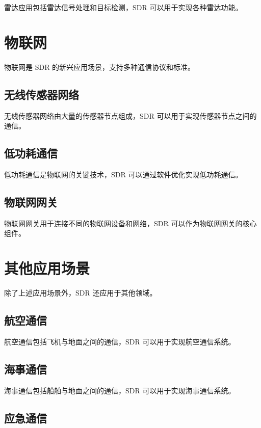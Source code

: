 \documentclass[UTF8]{ctexbook}
\begin{document}
雷达应用包括雷达信号处理和目标检测，SDR 可以用于实现各种雷达功能。

\section{物联网}

物联网是 SDR 的新兴应用场景，支持多种通信协议和标准。

\subsection{无线传感器网络}

无线传感器网络由大量的传感器节点组成，SDR 可以用于实现传感器节点之间的通信。

\subsection{低功耗通信}

低功耗通信是物联网的关键技术，SDR 可以通过软件优化实现低功耗通信。

\subsection{物联网网关}

物联网网关用于连接不同的物联网设备和网络，SDR 可以作为物联网网关的核心组件。

\section{其他应用场景}

除了上述应用场景外，SDR 还应用于其他领域。

\subsection{航空通信}

航空通信包括飞机与地面之间的通信，SDR 可以用于实现航空通信系统。

\subsection{海事通信}

海事通信包括船舶与地面之间的通信，SDR 可以用于实现海事通信系统。

\subsection{应急通信}
\end{document}

